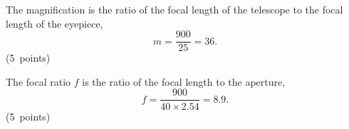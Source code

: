 The magnification is the ratio of the focal length of the telescope to the focal length of the eyepiece,
\[
m=\frac{900}{25}=36.
\]
\hfill\mbox{(5 points)}

The focal ratio $f$ is the ratio of the focal length to the aperture,
\[
f=\frac{900}{40\times2.54}=8.9.
\]
\hfill\mbox{(5 points)}
